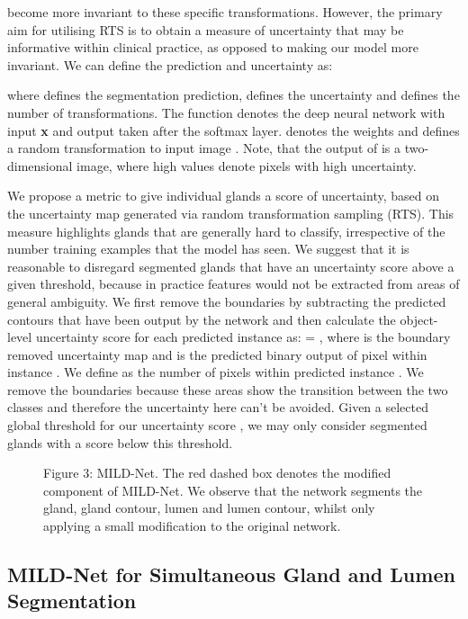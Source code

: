 \documentclass[3p]{elsarticle}
\begin{document}
become more invariant to these specific transformations. However, the primary aim for utilising RTS is to obtain a measure of uncertainty that may be informative within clinical practice, as opposed to making our model more invariant. We can define the prediction and uncertainty as:



\noindent where  defines the segmentation prediction,  defines the uncertainty and  defines the number of transformations. The function  denotes the deep neural network with input \textbf{x} and output taken after the softmax layer.  denotes the weights and  defines a random transformation  to input image . Note, that the output of  is a two-dimensional image, where high values denote pixels with high uncertainty. 

We propose a metric to give individual glands a score of uncertainty, based on the uncertainty map generated via random transformation sampling (RTS). This measure highlights glands that are generally hard to classify, irrespective of the number training examples that the model has seen. We suggest that it is reasonable to disregard segmented glands that have an uncertainty score above a given threshold, because in practice features would not be extracted from areas of general ambiguity. We first remove the boundaries by subtracting the predicted contours that have been output by the network and then calculate the object-level uncertainty score for each predicted instance  as:  = , where  is the boundary removed uncertainty map and  is the predicted binary output of pixel  within instance . We define  as the number of pixels within predicted instance . We remove the boundaries because these areas show the transition between the two classes and therefore the uncertainty here can't be avoided. Given a selected global threshold for our uncertainty score , we may only consider segmented glands with a score below this threshold. 

\begin{figure}[!t]
\centering
\captionsetup[subfigure]{labelformat=empty}
\caption*{Figure 3: MILD-Net. The red dashed box denotes the modified component of MILD-Net. We observe that the network segments the gland, gland contour, lumen and lumen contour, whilst only applying a small modification to the original network.}
\label{fig:detection}
\end{figure}

\subsection{MILD-Net for Simultaneous Gland and Lumen Segmentation}
\end{document}
